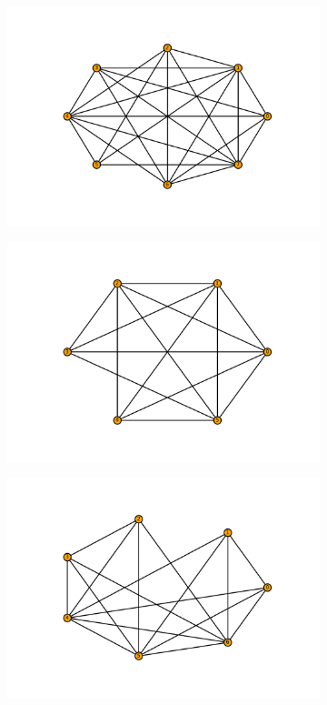 \documentclass{article}
\begin{document}
\begin{figure}[!hbtp]
    \begin{subfigure}{0.35\textwidth}
        \includegraphics[width=\textwidth]{./assets/images/coauthor01.pdf}
    \end{subfigure}
    \begin{subfigure}{0.35\textwidth}
        \includegraphics[width=\textwidth]{./assets/images/coauthor02.pdf}
    \end{subfigure}
    \begin{subfigure}{0.35\textwidth}
        \includegraphics[width=\textwidth]{./assets/images/coauthor03.pdf}

\end{subfigure}
\end{figure}
\end{document}
